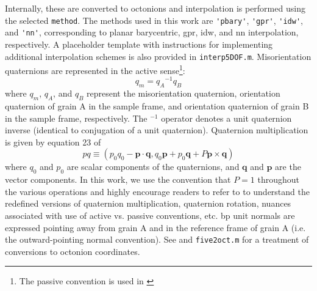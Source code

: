 \documentclass[final,twocolumn,12pt]{elsarticle}
\newcommand{\matlab}[1]{\mbox{\lstinline[style=Matlab-editor]{#1}}}
\begin{document}
Internally, these are converted to octonions and interpolation is performed using the selected \matlab{method}. The methods used in this work are \matlab{'pbary'}, \matlab{'gpr'}, \matlab{'idw'}, and \matlab{'nn'}, corresponding to planar barycentric, \gls{gpr}, \gls{idw}, and \gls{nn} interpolation, respectively. A placeholder template with instructions for implementing additional interpolation schemes is also provided in \matlab{interp5DOF.m}. Misorientation quaternions are represented in the active sense\footnote{The passive convention is used in \cite{francisGeodesicOctonionMetric2019}}:
\begin{equation}
    q_m = {q_A}^{-1}q_B
\end{equation}
where $q_m$, $q_A$, and $q_B$ represent the misorientation quaternion, orientation quaternion of grain A in the sample frame, and orientation quaternion of grain B in the sample frame, respectively. The $^{-1}$ operator denotes a unit quaternion inverse (identical to conjugation of a unit quaternion). Quaternion multiplication is given by equation 23 of \cite{rowenhorstConsistentRepresentationsConversions2015}
\begin{equation}
p q \equiv\left(p_{0} q_{0}-\mathbf{p} \cdot \mathbf{q}, q_{0} \mathbf{p}+p_{0} \mathbf{q}+P \mathbf{p} \times \mathbf{q}\right)
\end{equation}
where $q_0$ and $p_0$ are scalar components of the quaternions, and $\mathbf{q}$ and $\mathbf{p}$ are the vector components.
In this work, we use the convention that $P=1$ throughout the various operations and highly encourage readers to refer to \cite{rowenhorstConsistentRepresentationsConversions2015} to understand the redefined versions of quaternion multiplication, quaternion rotation, nuances associated with use of active vs. passive conventions, etc. \Gls{bp} unit normals are expressed pointing away from grain A and in the reference frame of grain A (i.e. the outward-pointing normal convention). See \cite{francisGeodesicOctonionMetric2019} and \matlab{five2oct.m} \cite{bairdFiveDegreeofFreedom5DOF2020} for a treatment of conversions to octonion coordinates.
\end{document}
